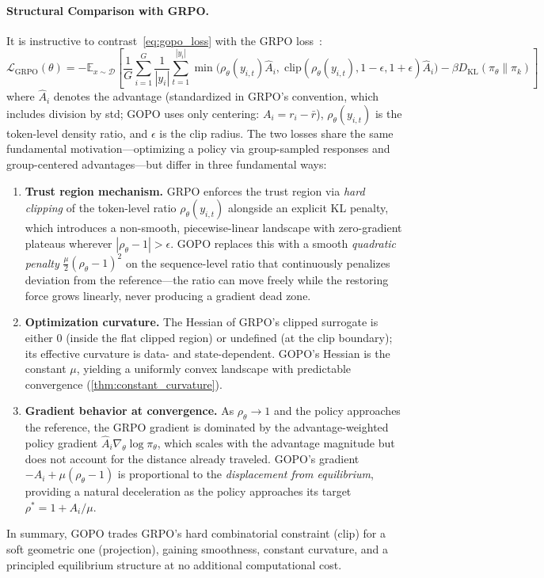 \documentclass[11pt]{article}
\theoremstyle{definition}
\theoremstyle{remark}
\newcommand{\E}{\mathbb{E}}
\newcommand{\KL}{\mathrm{KL}}
\newcommand{\loss}{\mathcal{L}}
\newcommand{\pik}{\pi_k}
\begin{document}
\paragraph{Structural Comparison with GRPO.}
It is instructive to contrast~\eqref{eq:gopo_loss} with the GRPO loss~\cite{Shao2024GRPO}:
\begin{equation}
\label{eq:grpo_loss}
    \loss_{\text{GRPO}}(\theta) = -\E_{x \sim \mathcal{D}}\left[\frac{1}{G}\sum_{i=1}^G \frac{1}{|y_i|}\sum_{t=1}^{|y_i|} \min\!\Big(\rho_\theta(y_{i,t}) \hat{A}_i,\; \text{clip}(\rho_\theta(y_{i,t}), 1{-}\epsilon, 1{+}\epsilon) \hat{A}_i\Big) - \beta D_{\KL}(\pi_\theta \| \pik)\right]
\end{equation}
where $\hat{A}_i$ denotes the advantage (standardized in GRPO's convention, which includes division by std; GOPO uses only centering: $A_i = r_i - \bar{r}$), $\rho_\theta(y_{i,t})$ is the token-level density ratio, and $\epsilon$ is the clip radius. The two losses share the same fundamental motivation---optimizing a policy via group-sampled responses and group-centered advantages---but differ in three fundamental ways:
\begin{enumerate}[leftmargin=2em]
    \item \textbf{Trust region mechanism.} GRPO enforces the trust region via \emph{hard clipping} of the token-level ratio $\rho_\theta(y_{i,t})$ alongside an explicit KL penalty, which introduces a non-smooth, piecewise-linear landscape with zero-gradient plateaus wherever $|\rho_\theta - 1| > \epsilon$. GOPO replaces this with a smooth \emph{quadratic penalty} $\frac{\mu}{2}(\rho_\theta - 1)^2$ on the sequence-level ratio that continuously penalizes deviation from the reference---the ratio can move freely while the restoring force grows linearly, never producing a gradient dead zone.
    \item \textbf{Optimization curvature.} The Hessian of GRPO's clipped surrogate is either $0$ (inside the flat clipped region) or undefined (at the clip boundary); its effective curvature is data- and state-dependent. GOPO's Hessian is the constant $\mu$, yielding a uniformly convex landscape with predictable convergence (\cref{thm:constant_curvature}).
    \item \textbf{Gradient behavior at convergence.} As $\rho_\theta \to 1$ and the policy approaches the reference, the GRPO gradient is dominated by the advantage-weighted policy gradient $\hat{A}_i \nabla_\theta \log\pi_\theta$, which scales with the advantage magnitude but does not account for the distance already traveled. GOPO's gradient $-A_i + \mu(\rho_\theta - 1)$ is proportional to the \emph{displacement from equilibrium}, providing a natural deceleration as the policy approaches its target $\rho^* = 1 + A_i/\mu$.
\end{enumerate}
In summary, GOPO trades GRPO's hard combinatorial constraint (clip) for a soft geometric one (projection), gaining smoothness, constant curvature, and a principled equilibrium structure at no additional computational cost.
\end{document}
